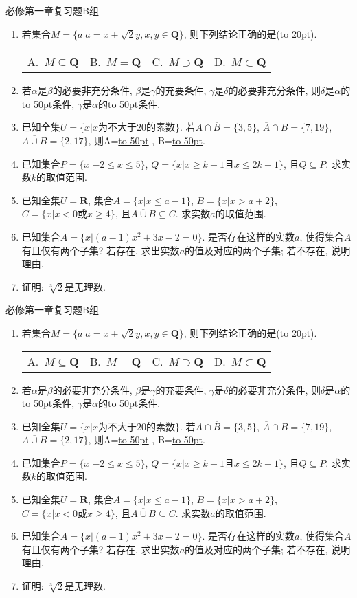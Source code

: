 \documentclass[10pt,a4paper]{article}
\newcommand{\blank}[1]{\underline{\hbox to #1pt{}}}
\newcommand{\bracket}[1]{(\hbox to #1pt{})}
\newcommand{\fourch}[4]{\par\begin{tabular}{p{.23\textwidth}p{.23\textwidth}p{.23\textwidth}p{.23\textwidth}}
A.~#1 &B.~#2& C.~#3& D.~#4
\end{tabular}}
\begin{document}
必修第一章复习题B组
\begin{enumerate}[1.]
\item 若集合$M=\{a|a=x+\sqrt2y, x,y\in \mathbf{Q}\}$, 则下列结论正确的是\bracket{20}.
\fourch{$M\subseteq \mathbf{Q}$}{$M=\mathbf{Q}$}{$M\supset \mathbf{Q}$}{$M\subset \mathbf{Q}$}
\item 若$\alpha$是$\beta$的必要非充分条件, $\beta$是$\gamma$的充要条件, $\gamma$是$\delta$的必要非充分条件, 则$\delta$是$\alpha$的\blank{50}条件, $\gamma$是$\alpha$的\blank{50}条件.
\item 已知全集$U=\{x|x\text{为不大于}20\text{的素数}\}$. 若$A\cap \overline{B}=\{3, 5\}$, $\overline{A}\cap B=\{7, 19\}$, $\overline{A\cup B}=\{2, 17\}$, 则A=\blank{50} , B=\blank{50}.
\item 已知集合$P=\{x|-2\le x\le 5\}$, $Q=\{x|x\ge k+1\text{且}x\le 2k-1\}$, 且$Q\subseteq P$. 求实数$k$的取值范围.
\item 已知全集$U=\mathbf{R}$, 集合$A=\{x|x\le a-1\}$, $B=\{x|x>a+2\}$, $C=\{x|x<0\text{或}x\ge 4\}$, 且$\overline{A\cup B}\subseteq C$. 求实数$a$的取值范围.
\item 已知集合$A=\{x|(a-1)x^2+3x-2=0\}$. 是否存在这样的实数$a$, 使得集合$A$有且仅有两个子集? 若存在, 求出实数$a$的值及对应的两个子集; 若不存在, 说明理由.
\item 证明: $\sqrt[3]{2}$是无理数. 
\end{enumerate}

必修第一章复习题B组
\begin{enumerate}[1.]
\item 若集合$M=\{a|a=x+\sqrt2y, x,y\in \mathbf{Q}\}$, 则下列结论正确的是\bracket{20}.
\fourch{$M\subseteq \mathbf{Q}$}{$M=\mathbf{Q}$}{$M\supset \mathbf{Q}$}{$M\subset \mathbf{Q}$}
\item 若$\alpha$是$\beta$的必要非充分条件, $\beta$是$\gamma$的充要条件, $\gamma$是$\delta$的必要非充分条件, 则$\delta$是$\alpha$的\blank{50}条件, $\gamma$是$\alpha$的\blank{50}条件.
\item 已知全集$U=\{x|x\text{为不大于}20\text{的素数}\}$. 若$A\cap \overline{B}=\{3, 5\}$, $\overline{A}\cap B=\{7, 19\}$, $\overline{A\cup B}=\{2, 17\}$, 则A=\blank{50} , B=\blank{50}.
\item 已知集合$P=\{x|-2\le x\le 5\}$, $Q=\{x|x\ge k+1\text{且}x\le 2k-1\}$, 且$Q\subseteq P$. 求实数$k$的取值范围.
\item 已知全集$U=\mathbf{R}$, 集合$A=\{x|x\le a-1\}$, $B=\{x|x>a+2\}$, $C=\{x|x<0\text{或}x\ge 4\}$, 且$\overline{A\cup B}\subseteq C$. 求实数$a$的取值范围.
\item 已知集合$A=\{x|(a-1)x^2+3x-2=0\}$. 是否存在这样的实数$a$, 使得集合$A$有且仅有两个子集? 若存在, 求出实数$a$的值及对应的两个子集; 若不存在, 说明理由.
\item 证明: $\sqrt[3]{2}$是无理数. 
\end{enumerate}
\end{document}
